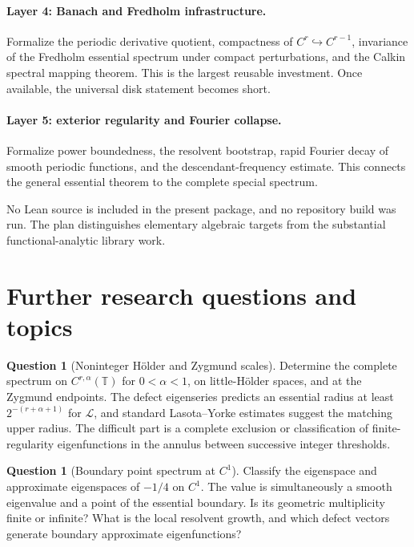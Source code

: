 \documentclass[11pt,a4paper]{article}
\theoremstyle{definition}
\newtheorem{question}[theorem]{Question}
\theoremstyle{remark}
\newcommand{\T}{\mathbb T}
\newcommand{\Lop}{\mathcal L}
\begin{document}
\paragraph{Layer 4: Banach and Fredholm infrastructure.}
Formalize the periodic derivative quotient, compactness of
$C^r\hookrightarrow C^{r-1}$, invariance of the Fredholm essential spectrum
under compact perturbations, and the Calkin spectral mapping theorem.  This
is the largest reusable investment.  Once available, the universal disk
statement becomes short.

\paragraph{Layer 5: exterior regularity and Fourier collapse.}
Formalize power boundedness, the resolvent bootstrap, rapid Fourier decay of
smooth periodic functions, and the descendant-frequency estimate.  This
connects the general essential theorem to the complete special spectrum.

No Lean source is included in the present package, and no repository build
was run.  The plan distinguishes elementary algebraic targets from the
substantial functional-analytic library work.

\section{Further research questions and topics}
\label{sec:questions}

\begin{question}[Noninteger H\"older and Zygmund scales]
Determine the complete spectrum on $C^{r,\alpha}(\T)$ for
$0<\alpha<1$, on little-H\"older spaces, and at the Zygmund endpoints.  The
defect eigenseries predicts an essential radius at least
$2^{-(r+\alpha+1)}$ for $\Lop$, and standard Lasota--Yorke estimates suggest
the matching upper radius.  The difficult part is a complete exclusion or
classification of finite-regularity eigenfunctions in the annulus between
successive integer thresholds.
\end{question}

\begin{question}[Boundary point spectrum at $C^1$]
Classify the eigenspace and approximate eigenspaces of $-1/4$ on $C^1$.
The value is simultaneously a smooth eigenvalue and a point of the essential
boundary.  Is its geometric multiplicity finite or infinite?  What is the
local resolvent growth, and which defect vectors generate boundary
approximate eigenfunctions?
\end{question}
\end{document}
